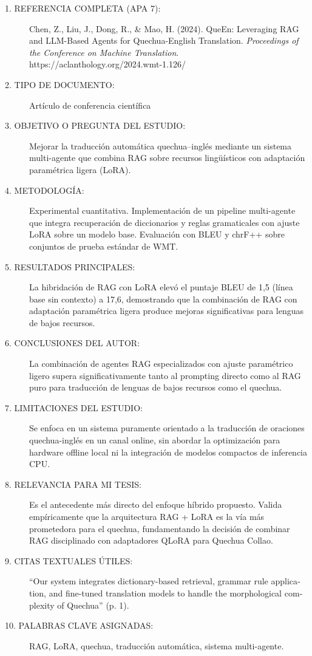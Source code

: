 \begin{description}
	\item[1. REFERENCIA COMPLETA (APA 7):] Chen, Z., Liu, J., Dong, R., \& Mao, H. (2024). QueEn: Leveraging RAG and LLM-Based Agents for Quechua-English Translation. \textit{Proceedings of the Conference on Machine Translation}. https://aclanthology.org/2024.wmt-1.126/
	\item[2. TIPO DE DOCUMENTO:] Artículo de conferencia científica
	\item[3. OBJETIVO O PREGUNTA DEL ESTUDIO:] Mejorar la traducción automática quechua--inglés mediante un sistema multi-agente que combina RAG sobre recursos lingüísticos con adaptación paramétrica ligera (LoRA).
	\item[4. METODOLOGÍA:] Experimental cuantitativa. Implementación de un pipeline multi-agente que integra recuperación de diccionarios y reglas gramaticales con ajuste LoRA sobre un modelo base. Evaluación con BLEU y chrF++ sobre conjuntos de prueba estándar de WMT.
	\item[5. RESULTADOS PRINCIPALES:] La hibridación de RAG con LoRA elevó el puntaje BLEU de 1,5 (línea base sin contexto) a 17,6, demostrando que la combinación de RAG con adaptación paramétrica ligera produce mejoras significativas para lenguas de bajos recursos.
	\item[6. CONCLUSIONES DEL AUTOR:] La combinación de agentes RAG especializados con ajuste paramétrico ligero supera significativamente tanto al prompting directo como al RAG puro para traducción de lenguas de bajos recursos como el quechua.
	\item[7. LIMITACIONES DEL ESTUDIO:] Se enfoca en un sistema puramente orientado a la traducción de oraciones quechua-inglés en un canal online, sin abordar la optimización para hardware offline local ni la integración de modelos compactos de inferencia CPU.
	\item[8. RELEVANCIA PARA MI TESIS:] Es el antecedente más directo del enfoque híbrido propuesto. Valida empíricamente que la arquitectura RAG + LoRA es la vía más prometedora para el quechua, fundamentando la decisión de combinar RAG disciplinado con adaptadores QLoRA para Quechua Collao.
	\item[9. CITAS TEXTUALES ÚTILES:] \foreignlanguage{english}{``Our system integrates dictionary-based retrieval, grammar rule application, and fine-tuned translation models to handle the morphological complexity of Quechua''} (p. 1).
	\item[10. PALABRAS CLAVE ASIGNADAS:] RAG, LoRA, quechua, traducción automática, sistema multi-agente.
\end{description}

